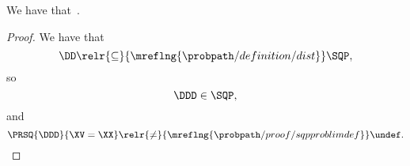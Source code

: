 \begin{proposition}
  We have that\ \problimdefprop.%
\end{proposition}

\begin{proof}
  We have that
  $$\DD \relr {\subseteq} {\mreflng{\probpath/definition/dist}} \SQP,$$
  so $$\DDD \in \SQP,$$
  and
  $$\PRSQ{\DDD}{\XV = \XX} \relr {\ne} {\mreflng{\probpath/proof/sqpproblimdef}} \undef.$$%
\end{proof}
